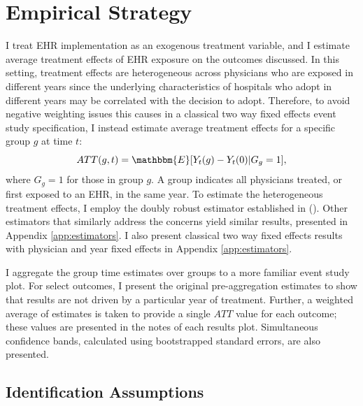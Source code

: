 \documentclass[12pt]{article}
\begin{document}
\section{Empirical Strategy}\label{sec:empstrat}

I treat EHR implementation as an exogenous treatment variable, and I estimate average treatment effects of EHR exposure on the outcomes discussed. In this setting, treatment effects are heterogeneous across physicians who are exposed in different years since the underlying characteristics of hospitals who adopt in different years may be correlated with the decision to adopt. Therefore, to avoid negative weighting issues this causes in a classical two way fixed effects event study specification, I instead estimate average treatment effects for a specific group $g$ at time $t$: 
$$ATT(g,t)=\mathbbm{E}[Y_t(g)-Y_t(0)|G_g=1],$$
where $G_g=1$ for those in group $g$. A group indicates all physicians treated, or first exposed to an EHR, in the same year. To estimate the heterogeneous treatment effects, I employ the doubly robust estimator established in \citeauthor{sant2020doubly} (\citeyear{sant2020doubly}). Other estimators that similarly address the concerns yield similar results, presented in Appendix \ref{app:estimators}. I also present classical two way fixed effects results with physician and year fixed effects in Appendix \ref{app:estimators}.

I aggregate the group time estimates over groups to a more familiar event study plot. For select outcomes, I present the original pre-aggregation estimates to show that results are not driven by a particular year of treatment.  Further, a weighted average of estimates is taken to provide a single $ATT$ value for each outcome; these values are presented in the notes of each results plot. Simultaneous confidence bands, calculated using bootstrapped standard errors, are also presented. 

\subsection{Identification Assumptions}
\end{document}
